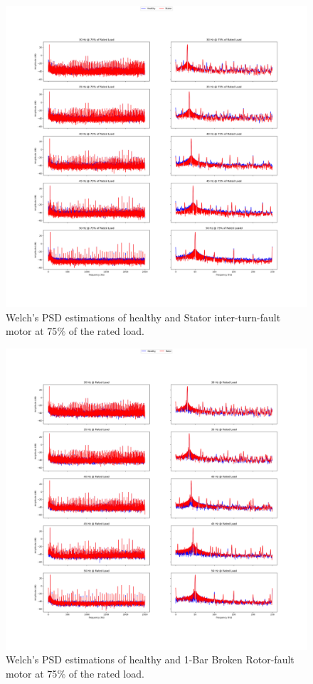 \pagebreak
\begin{figure}[h]
	\centering
	\includegraphics[width=0.8\paperwidth,keepaspectratio=true]{./fig/psdstator_75.png}
	\caption{Welch's PSD estimations of healthy and Stator inter-turn-fault motor at 75$\%$ of the rated load.}	
	\label{psdstator75}
\end{figure}
\pagebreak
\begin{figure}[h]
	\centering
	\includegraphics[width=0.8\paperwidth,keepaspectratio=true]{./fig/psdrotor_100.png}
	\caption{Welch's PSD estimations of healthy and 1-Bar Broken Rotor-fault motor at 75$\%$ of the rated load.}	
	\label{psdrotor100}
\end{figure}
